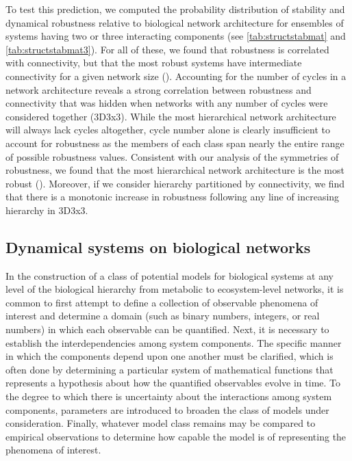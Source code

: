 To test this prediction, we computed the probability distribution of stability and dynamical robustness relative to biological network architecture for ensembles of systems having two or three interacting components (see \ref{tab:structstabmat} and \ref{tab:structstabmat3}). For all of these, we found that robustness is correlated with connectivity, but that the most robust systems have intermediate connectivity for a given network size (). Accounting for the number of cycles in a network architecture reveals a strong correlation between robustness and connectivity that was hidden when networks with any number of cycles were considered together (3D3x3). While the most hierarchical network architecture will always lack cycles altogether, cycle number alone is clearly insufficient to account for robustness as the members of each class span nearly the entire range of possible robustness values. Consistent with our analysis of the symmetries of robustness, we found that the most hierarchical network architecture is the most robust (). Moreover, if we consider hierarchy partitioned by connectivity, we find that there is a monotonic increase in robustness following any line of increasing hierarchy in 3D3x3.

\subsection{Dynamical systems on biological networks}
In the construction of a class of potential models for biological systems at any level of the biological hierarchy from metabolic to ecosystem-level networks, it is common to first attempt to define a collection of observable phenomena of interest and determine a domain (such as binary numbers, integers, or real numbers) in which each observable can be quantified. Next, it is necessary to establish the interdependencies among system components. The specific manner in which the components depend upon one another must be clarified, which is often done by determining a particular system of mathematical functions that represents a hypothesis about how the quantified observables evolve in time. To the degree to which there is uncertainty about the interactions among system components, parameters are introduced to broaden the class of models under consideration. Finally, whatever model class remains may be compared to empirical observations to determine how capable the model is of representing the phenomena of interest.

